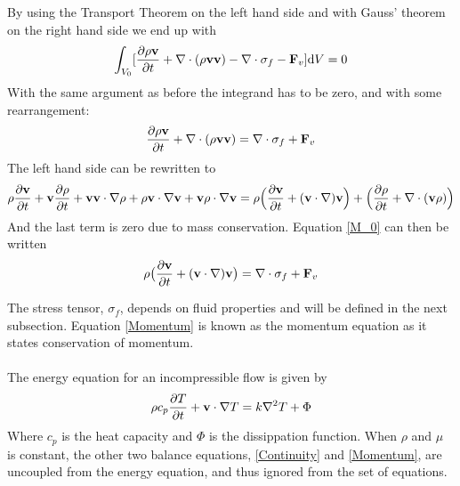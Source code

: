 By using the Transport Theorem on the left hand side and with Gauss' theorem on the right hand side we end up with
\begin{align*} \int_{V_0} [ \frac{\partial \rho \mathbf{v}}{\partial t} + \nabla \cdot (\rho \mathbf{v}\mathbf{v} ) - \nabla \cdot \sigma_f - \mathbf{F}_v] \mathrm{d}V = 0
\end{align*}
With the same argument as before the integrand has to be zero, and with some rearrangement:
\begin{align}
\frac{\partial \rho \mathbf{v}}{\partial t} + \nabla \cdot (\rho \mathbf{v}\mathbf{v} ) = \nabla \cdot \sigma_f + \mathbf{F}_v \label{M_0}
\end{align} 
The left hand side can be rewritten to
\begin{align}
\rho \frac{\partial \mathbf{v}}{\partial t} + \mathbf{v} \frac{\partial \rho}{\partial t} + \mathbf{v} \mathbf{v} \cdot \nabla \rho + \rho \mathbf{v} \cdot \nabla \mathbf{v} + \mathbf{v}\rho \cdot \nabla \mathbf{v} = \rho\Big{(}\frac{\partial \mathbf{v}}{\partial t} + (\mathbf{v} \cdot \nabla ) \mathbf{v} \Big{)} + \Big{(}\frac{\partial \rho}{\partial t} + \nabla \cdot (\mathbf{v} \rho)\Big{)}
\end{align}
And the last term is zero due to mass conservation. Equation \eqref{M_0} can then be written
\begin{align}
\rho \big{(}\frac{\partial \mathbf{v}}{\partial t} + (\mathbf{v} \cdot \nabla ) \mathbf{v} \big{)} = \nabla \cdot \sigma_f + \mathbf{F}_v \label{Momentum}
\end{align} 

The stress tensor, $\sigma_f$, depends on fluid properties and will be defined in the next subsection. Equation \eqref{Momentum} is known as the momentum equation as it states conservation of momentum.
\\
\\
The energy equation for an incompressible flow is given by
\begin{align}
\rho c_p \frac{\partial T}{\partial t} + \mathbf{v}\cdot \nabla T = k \nabla^2 T + \Phi \label{Energy}
\end{align}
Where $c_p$ is the heat capacity and $\Phi$ is the dissippation function. When $\rho$ and $\mu$ is constant, the other two balance equations, \eqref{Continuity} and \eqref{Momentum}, are uncoupled from the energy equation, and thus ignored from the set of equations. 
